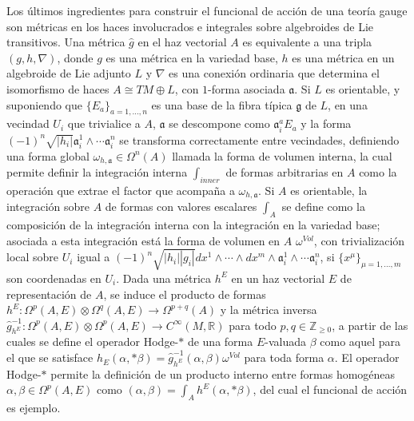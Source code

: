 Los últimos ingredientes para construir el funcional de acción de una teoría gauge son métricas en los haces involucrados e integrales sobre algebroides de Lie transitivos. Una métrica $\hat g$ en el haz vectorial $A$ es equivalente a una tripla $(g, h, \nabla)$, donde $g$ es una métrica en la variedad base, $h$ es una métrica en un algebroide de Lie adjunto $L$ y $\nabla$ es una conexión ordinaria que determina el isomorfismo de haces $A \cong TM \oplus L$, con $1$-forma asociada $\mathfrak a$. Si $L$ es orientable, y suponiendo que $\{E_a\}_{a = 1, \dots, n}$ es una base de la fibra típica $\mathfrak g$ de $L$, en una vecindad $U_i$ que trivialice a $A$, $\mathfrak a$ se descompone como $\mathfrak a_i^a E_a$ y la forma $(-1)^{n}\sqrt{|h_i|} \mathfrak a_i^1 \wedge \cdots \mathfrak a_i^{n}$ se transforma correctamente entre vecindades, definiendo una forma global $\omega_{h,\mathfrak a} \in \Omega^{n}(A)$ llamada la forma de volumen interna, la cual permite definir la integración interna $\int_{inner}$ de formas arbitrarias en $A$ como la operación que extrae el factor que acompaña a $\omega_{h,\mathfrak a}$. Si $A$ es orientable, la integración sobre $A$ de formas con valores escalares $\int_A$ se define como la composición de la integración interna con la integración en la variedad base; asociada a esta integración está la forma de volumen en $A$ $\omega^{Vol}$, con trivialización local sobre $U_i$ igual a $(-1)^{n}\sqrt{|h_i| |g_i|} dx^1\wedge\cdots \wedge dx^m \wedge \mathfrak a_i^1 \wedge \cdots \mathfrak a_i^{n}$, si $\{x^\mu\}_{\mu = 1, \dots, m}$ son coordenadas en $U_i$. Dada una métrica $h^E$ en un haz vectorial $E$ de representación de $A$, se induce el producto de formas $h^E: \Omega^p(A, E)\otimes \Omega^q(A, E) \to \Omega^{p+q}(A)$ y la métrica inversa $\hat g^{-1}_{h^E}: \Omega^p(A, E)\otimes \Omega^p(A, E) \to C^\infty(M, \mathbb R)$ para todo $p, q \in \mathbb Z_{\geq 0}$, a partir de las cuales se define el operador Hodge-$*$ de una forma $E$-valuada $\beta$ como aquel para el que se satisface $h_E(\alpha, *\beta) = \hat g_{h^E}^{-1}(\alpha, \beta) \omega^{Vol}$ para toda forma $\alpha$. El operador Hodge-$*$ permite la definición de un producto interno entre formas homogéneas $\alpha, \beta \in \Omega^p(A, E)$ como $(\alpha, \beta) = \int_A h^E(\alpha, *\beta)$, del cual el funcional de acción es ejemplo.

